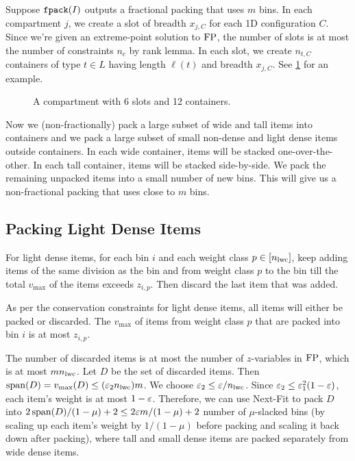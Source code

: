 Suppose $\operatorname{\mathtt{fpack}}(I)$ outputs a fractional packing that uses $m$ bins.
In each compartment $j$, we create a slot of breadth $x_{j,C}$
for each 1D configuration $C$.
Since we're given an extreme-point solution to $\operatorname{FP}$, the number of slots is
at most the number of constraints $n_c$ by rank lemma.
In each slot, we create $n_{t,C}$ containers of type $t \in L$
having length $\ell(t)$ and breadth $x_{j,C}$.
See \cref{fig:compart-to-cont} for an example.

\begin{figure}[htb]
\centering

\caption{A compartment with 6 slots and 12 containers.}
\label{fig:compart-to-cont}
\end{figure}

Now we (non-fractionally) pack a large subset of wide and tall items into containers
and we pack a large subset of small non-dense and light dense items outside containers.
In each wide container, items will be stacked one-over-the-other.
In each tall container, items will be stacked side-by-side.
We pack the remaining unpacked items into a small number of new bins.
This will give us a non-fractional packing that uses close to $m$ bins.

\subsection{Packing Light Dense Items}
\label{sec:algo:pack-light}

For light dense items, for each bin $i$ and each weight class $p \in [n_{\mathrm{lwc}}]$,
keep adding items of the same division as the bin and from weight class $p$ to the bin
till the total $v_{\max}$ of the items exceeds $z_{i,p}$.
Then discard the last item that was added.

As per the conservation constraints for light dense items, all items will
either be packed or discarded. The $v_{\max}$ of items from weight class $p$
that are packed into bin $i$ is at most $z_{i,p}$.

The number of discarded items is at most the number of $z$-variables in $\operatorname{FP}$,
which is at most $m n_{\mathrm{lwc}}$. Let $D$ be the set of discarded items. Then
$\operatorname{span}(D) = v_{\max}(D) \le (\varepsilon_2 n_{\mathrm{lwc}}) m$.
We choose $\varepsilon_2 \le \varepsilon/n_{\mathrm{lwc}}$.
Since $\varepsilon_2 \le \varepsilon_1^2(1-\varepsilon)$, each item's weight is at most $1-\varepsilon$.
Therefore, we can use Next-Fit to pack $D$ into
$2\operatorname{span}(D)/(1-\mu) + 2 \le 2\varepsilon m/(1-\mu) + 2$ number of
$\mu$-slacked bins (by scaling up each item's weight by $1/(1-\mu)$ before packing
and scaling it back down after packing),
where tall and small dense items are packed separately from wide dense items.

